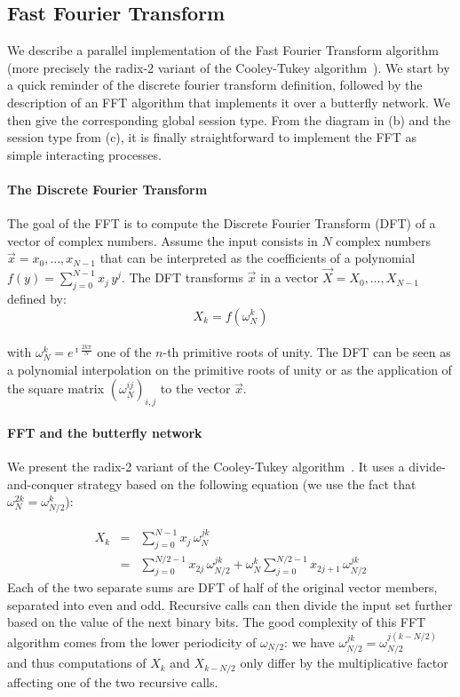 \documentclass{LMCS}
\newcommand{\e}{\ensuremath{e}}
\begin{document}
\subsection{Fast Fourier Transform}
\label{subsec:fft}
\noindent 
We describe a
parallel implementation of the Fast Fourier Transform algorithm (more
precisely the radix-2 variant of the Cooley-Tukey algorithm~\cite{CT65}).
We start by a quick reminder of the discrete fourier transform definition,
followed by the description of an FFT algorithm that implements it over a
butterfly network. We then give the corresponding global session type. From the
diagram in (b) and the session type from (c), it is finally straightforward to
implement the FFT as simple interacting processes.

\paragraph{\bf The Discrete Fourier Transform}  
The goal of the FFT is to compute the Discrete Fourier Transform
(DFT) of a vector of complex numbers.
Assume the input consists in $N$ complex numbers $\vec{x}=x_0, \ldots,
x_{N-1}$ that can be interpreted as the coefficients of a polynomial
$f(y)=\sum_{j=0}^{N-1}x_j\,y^j$.  The DFT transforms $\vec{x}$ in a vector
$\vec{X}=X_0, \ldots, X_{N-1}$ defined by:
$$
X_k = f(\omega_N^k) 
$$\\[-3ex]
\noindent
with $\omega_N^k=\e^{ \imath\frac{ 2 k\pi }{N}}$ one of the $n$-th primitive
roots of unity. The DFT can be seen as a polynomial interpolation on the
primitive roots of unity or as the application of the square matrix
$(\omega_N^{ij})_{i,j}$ to the vector $\vec{x}$.

\paragraph{\bf FFT and the butterfly network} 
We present the radix-2 variant of the Cooley-Tukey algorithm~\cite{CT65}. It uses a divide-and-conquer strategy based on the following equation (we use
the fact that $\omega_N^{2k}=\omega_{N/2}^k$):

\[
\begin{array}{rcl}
  X_k& = & \sum_{j=0}^{N-1}x_j\,\omega_N^{jk} \\[1mm]
& = &\sum_{j=0}^{N/2-1}x_{2j}\,\omega_{N/2}^{jk}
  + \omega_N^k\sum_{j=0}^{N/2-1}x_{2j+1}\,\omega_{N/2}^{jk}
\end{array}
\]
Each of the two separate sums are DFT of half of the original vector members,
separated into even and odd. Recursive calls can then divide the input set
further based on the value of the next binary bits. The good complexity of this
FFT algorithm comes from the lower periodicity of $\omega_{N/2}$: we have
$\omega_{N/2}^{jk}=\omega_{N/2}^{j(k-N/2)}$ and thus computations of $X_k$ and
$X_{k-N/2}$ only differ by the multiplicative factor affecting one of the two
recursive calls.
\end{document}
